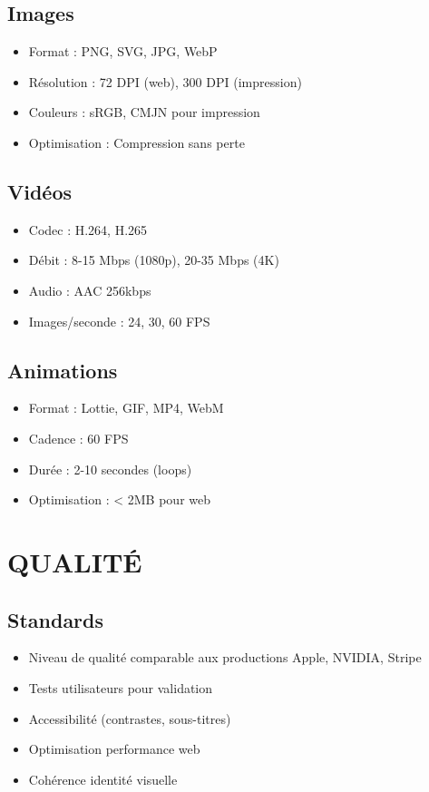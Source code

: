 \documentclass[12pt,a4paper,oneside]{book}
\begin{document}
\section{Images}
\begin{itemize}
\item Format : PNG, SVG, JPG, WebP
\item Résolution : 72 DPI (web), 300 DPI (impression)
\item Couleurs : sRGB, CMJN pour impression
\item Optimisation : Compression sans perte
\end{itemize}

\section{Vidéos}
\begin{itemize}
\item Codec : H.264, H.265
\item Débit : 8-15 Mbps (1080p), 20-35 Mbps (4K)
\item Audio : AAC 256kbps
\item Images/seconde : 24, 30, 60 FPS
\end{itemize}

\section{Animations}
\begin{itemize}
\item Format : Lottie, GIF, MP4, WebM
\item Cadence : 60 FPS
\item Durée : 2-10 secondes (loops)
\item Optimisation : < 2MB pour web
\end{itemize}

\chapter{QUALITÉ}

\section{Standards}
\begin{itemize}
\item Niveau de qualité comparable aux productions Apple, NVIDIA, Stripe
\item Tests utilisateurs pour validation
\item Accessibilité (contrastes, sous-titres)
\item Optimisation performance web
\item Cohérence identité visuelle
\end{itemize}
\end{document}
